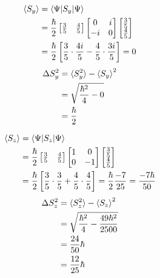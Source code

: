 \documentclass[12pt]{article}
\begin{document}
\begin{equation}
    \begin{split}
            \braket{S_y} &= \braket{\Psi|S_y|\Psi} \\
            &= \frac{\hbar}{2}\begin{bmatrix} \frac{3}{5} & \frac{4}{5} \\ \end{bmatrix} \begin{bmatrix} 0 & i \\ -i & 0 \end{bmatrix} \begin{bmatrix} \frac{3}{5} \\ \frac{4}{5} \end{bmatrix} \\
            &= \frac{\hbar}{2}\left[\frac{3}{5}\cdot\frac{4i}{5} - \frac{4}{5}\cdot\frac{3i}{5}\right] = 0 \\
    \end{split}
\end{equation}
\begin{equation}
    \begin{split}
        \Delta S_y^2 &= \braket{S_y^2} - \braket{S_y}^2 \\
        &= \sqrt{\frac{\hbar^2}{4} - 0} \\
        &= \frac{\hbar}{2} \\
    \end{split}
\end{equation}

\begin{equation}
    \begin{split}
            \braket{S_z} &= \braket{\Psi|S_z|\Psi} \\
            &= \frac{\hbar}{2}\begin{bmatrix} \frac{3}{5} & \frac{4}{5} \\ \end{bmatrix} \begin{bmatrix} 1 & 0 \\ 0 & -1 \end{bmatrix} \begin{bmatrix} \frac{3}{5} \\ \frac{4}{5} \end{bmatrix} \\
            &= \frac{\hbar}{2}\left[\frac{3}{5}\cdot\frac{3}{5} + \frac{4}{5}\cdot\frac{4}{5}\right] = \frac{\hbar}{2}\frac{-7}{25} = \frac{-7\hbar}{50}
    \end{split}
\end{equation}
\begin{equation}
    \begin{split}
        \Delta S_z^2 &= \braket{S_z^2} - \braket{S_z}^2 \\
        &= \sqrt{\frac{\hbar^2}{4} - \frac{49\hbar^2}{2500}} \\
        &= \frac{24}{50}\hbar \\
        &= \frac{12}{25}\hbar \\
    \end{split}
\end{equation}
\end{document}
